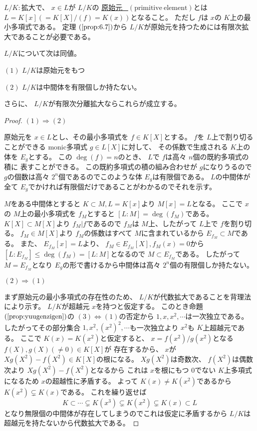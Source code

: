 \documentclass[../master_galois_theory]{subfiles}
\begin{document}
\begin{defi}
  $L/K:$拡大で、 $x \in L$が $L/K$の
  \underline{原始元 \  $(\mathrm{primitive \  element})$}とは
  $L = K[x] (=K[X]/(f) = K(x))$となること。
  ただし $f$は $x$の $K$上の最小多項式である。
  定理 $(\mathrm{\ref{prop:6.7}})$から $L/K$が原始元を持つためには有限次拡大であることが必要である。
\end{defi}

\begin{theo}
  $L/K$について次は同値。

  $(1)$
  $L/K$は原始元をもつ

  $(2)$
  $L/K$は中間体を有限個しか持たない。

  さらに、 $L/K$が有限次分離拡大ならこれらが成立する。
\end{theo}

\begin{proof}
  $(1) \Rightarrow (2)$

  原始元を $x \in L$とし、その最小多項式を $f \in K[X]$とする。
  $f$を $L$上で割り切ることができる \rm{monic}多項式 $g \in L[X]$に対して、
  その係数で生成される $K$上の体を $E_g$とする。
  この $\deg(f) = n$のとき、 $L$で $f$は高々 $n$個の既約多項式の積に
  表すことができる。
  この既約多項式の積の組み合わせが $g$になりうるので
  $g$の個数は高々 $2^n$個であるのでこのような体 $E_g$は有限個である。
  $L$の中間体が全て $E_g$でかければ有限個だけであることがわかるのでそれを示す。

  $M$をある中間体とすると $K \subset M , L = K[x]$より $M[x] = L$となる。
  ここで $x$の $M$上の最小多項式を $f_M$とすると $[L:M] = \deg(f_M)$である。
  $K[X] \subset M[X]$より $f_M | f$であるので $f_M$は
  $M$上、したがって $L$上で $f$を割り切る。
  $f_M \in M[X]$より $f_M$の係数はすべて $M$に含まれているから
  $E_{f_M} \subset M$である。
  また、 $E_{f_M}[x] = L$より、 $f_M \in E_{f_M}[X] , f_M(x) = 0$から
  $[L:E_{f_M}] \leq \deg(f_M) = [L:M]$となるので $M \subset E_{f_M}$である。
  したがって $M = E_{f_M}$となり $E_g$の形で書けるから中間体は高々 $2^n$個の有限個しか持たない。

  $(2) \Rightarrow (1)$

  まず原始元の最小多項式の存在性のため、
  $L/K$が代数拡大であることを背理法により示す。
  $L/K$が超越元 $x$を持つと仮定する。
  このとき命題 $(\mathrm{\ref{prop:yuugenzigen}})$の $(3) \Leftrightarrow (1)$の否定から
  $1 , x , x^2 , \cdots$は一次独立である。
  したがってその部分集合 $1 , x^2 , (x^2)^2 , \cdots$も一次独立より
  $x^2$も $K$上超越元である。
  ここで $K(x) = K(x^2)$と仮定すると、
  $x = f(x^2)/g(x^2)$となる $f(X) , g(X) (\neq 0) \in K[X]$が
  存在するから、 $x$が $X g(X^2) - f(X^2) \in K[X]$の根になる。
  $X g(X^2)$は奇数次、 $f(X^2)$は偶数次より $X g(X^2) - f(X^2)$となるから
  これは $x$を根にもつ $0$でない $K$上多項式になるため $x$の超越性に矛盾する。
  よって $K(x) \neq K(x^2)$であるから $K(x^2) \subsetneq K(x)$である。
  これを繰り返せば
  \[
  K \subset \cdots \subsetneq K(x^3) \subsetneq K(x^2) \subsetneq K(x) \subset L
  \]
  となり無限個の中間体が存在してしまうのでこれは仮定に矛盾するから
  $L/K$は超越元を持たないから代数拡大である。


\end{proof}
\end{document}
